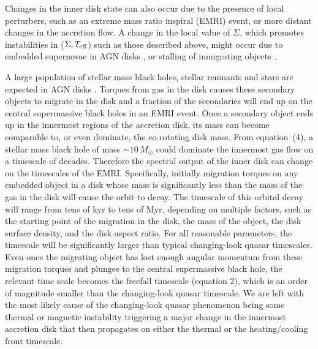 \documentclass[iop]{emulateapj}
\def\eg{{e.g.}}
\begin{document}
Changes in the inner disk state can also occur due to the presence
of local perturbers, such as an extreme mass ratio inspiral (EMRI)
event, or more distant changes in the accretion flow.  A change in
the local value of $\dot{\Sigma}$, which promotes instabilities in
($\Sigma,T_{\rm eff}$) such as those described above, might occur
due to embedded supernovae in AGN disks \citep{McKernan:14,
McKernan:17}, or stalling of inmigrating objects \citep{Bellovary:16}.

A large population of stellar mass black holes, stellar remnants
and stars are expected in AGN disks \citep[\eg,][]{Syer:91,
Artymowicz:93, McKernan:12}.  Torques from gas in the disk causes
these secondary objects to migrate in the disk and a fraction of
the secondaries will end up on the central supermassive black holes
in an EMRI event. Once a secondary object ends up in the innermost
regions of the accretion disk, its mass can become comparable to,
or even dominate, the co-rotating disk mass. From equation~(4), a
stellar mass black hole of mass $\sim 10\, M_{\odot}$ could dominate
the innermost gas flow on a timescale of decades.  Therefore the
spectral output of the inner disk can change on the timescales of
the EMRI.  Specifically, initially migration torques on any embedded
object in a disk whose mass is significantly less than the mass of
the gas in the disk will cause the orbit to decay.  The timescale
of this orbital decay will range from tens of kyr to tens of Myr,
depending on multiple factors, such as the starting point of the
migration in the disk, the mass of the object, the disk surface
density, and the disk aspect ratio.  For all reasonable parameters,
the timescale will be significantly larger than typical changing-look
quasar timescales.  Even once the migrating object has lost enough
angular momentum from these migration torques and plunges to the
central supermassive black hole, the relevant time scale becomes
the freefall timescale (equation 2), which is an order of magnitude
smaller than the changing-look quasar timescale.  We are left with
the most likely cause of the changing-look quasar phenomenon being
some thermal or magnetic instability triggering a major change in
the innermost accretion disk that then propagates on either the
thermal or the heating/cooling front timescale.
\end{document}
